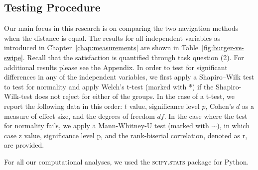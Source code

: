 \documentclass{sig-alternate-05-2015}
\newcommand{\todo}{\textbf{TODO:} \textbf}
\begin{document}
\subsection{Testing Procedure}
Our main focus in this research is on comparing the two navigation methods when the distance is equal.
The results for all independent variables as introduced in Chapter~\ref{chap:measurements} are shown in Table~\ref{fig:burger-vs-swipe}. Recall that the
satisfaction is quantified through task question (2). For additional results please see the Appendix.
In order to test for significant differences in any of the independent variables, we first apply a Shapiro–Wilk test to 
test for normality and apply Welch's t-test (marked with *) if the Shapiro-Wilk-test does not reject for either of the groups.
In the case of a t-test, we report the following data in this order: $t$ value, significance level $p$, Cohen's $d$ as a measure of effect size, and the degrees of
freedom $df$. 
In the case where the test for normality fails, we apply a Mann-Whitney-U test (marked with $\sim$), in which case z value, significance level p, and
the rank-biserial correlation, denoted as r, are provided.

For all our computational analyses, we used the \textsc{scipy.stats} package for Python.
\begin{table}[!h]
\centering
\caption{Comparing burger and swipe for same d}
\label{fig:burger-vs-swipe}
\end{table}
\end{document}

